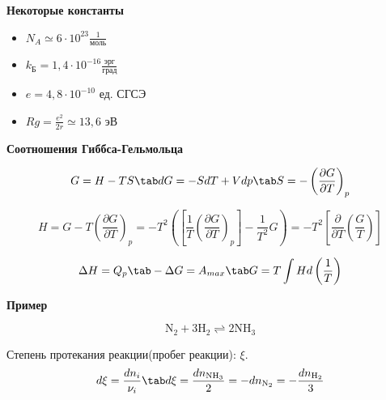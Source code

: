 \begin{lecture}
	\begin{center}
	\textbf{Некоторые константы}\\
	\end{center}

		\begin{itemize}
		\item $N_A \simeq 6 \cdot 10^{23} \frac{1}{\text{моль}}$
		\item $k_{\text{Б}} = 1,4 \cdot 10^{-16} \frac{\text{эрг}}{\text{град}}$
		\item $e = 4,8 \cdot 10^{-10}$ ед. СГСЭ
		\item $Rg = \frac{e^2}{2r} \simeq 13,6$ эВ
		\end{itemize}
	
	\begin{center}
		\textbf{Соотношения Гиббса-Гельмольца}\\
	\end{center}
	
	\begin{equation}	
	\begin{aligned}
	G = H - TS \tab dG = -SdT + Vdp \tab S = - \left( \dfrac{\partial G}{\partial T} \right)_{p}
	\end{aligned}
	\end{equation}
	
	\begin{equation}
	H = G - T\left( \dfrac{\partial G}{\partial T} \right)_{p} = -T^2 \left(\left[\frac{1}{T}\left( \dfrac{\partial G}{\partial T} \right)_{p}\right] - \frac{1}{T^2}G\right) = -T^2 \left[\dfrac{\partial}{\partial T}\left(\frac{G}{T}\right)\right]
	\end{equation}
	
	\begin{equation}	
	\begin{aligned}
	\Delta H = Q_p \tab -\Delta G = A_{max} \tab G = T \int H d \left( \frac{1}{T}\right)
	\end{aligned}
	\end{equation}
	
	\begin{center}
		\textbf{Пример}\\
	\end{center}
	\begin{equation}
		\mathrm{N_2 + 3H_2 \rightleftharpoons  2NH_3}
	\end{equation}
	
	Степень протекания реакции(пробег реакции): $\xi$.
	\begin{equation}	
	\begin{aligned}
	d \xi = \frac{dn_i}{\nu_i} \tab d\xi = \frac{dn_{\mathrm{NH_3}}}{2} = -dn_{\mathrm{N_2}} = -\frac{dn_{\mathrm{H_2}}}{3}
	\end{aligned}
	\end{equation}	
	

\end{lecture}
